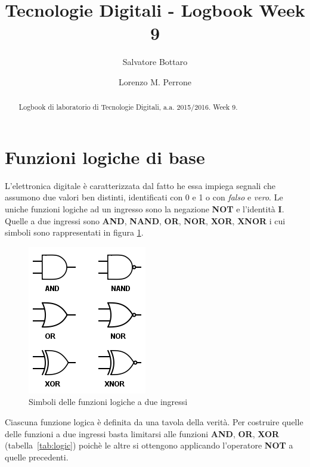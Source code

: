 \documentclass[journal, a4paper]{IEEEtran}
\begin{document}
	\title{Tecnologie Digitali - Logbook Week 9}
	\author[1]{Salvatore Bottaro}
		\author[2]{Lorenzo M. Perrone}
	\maketitle
	
\begin{abstract}
	Logbook di laboratorio di Tecnologie Digitali, a.a. 2015/2016. Week 9.
\end{abstract}

\section{Funzioni logiche di base}

L'elettronica digitale è caratterizzata dal fatto he essa impiega segnali che assumono due valori ben distinti, identificati con 0 e 1 o con \emph{falso} e \emph{vero}. Le uniche funzioni logiche ad un ingresso sono la negazione \textbf{NOT} e l'identità \textbf{I}. Quelle a due ingressi sono \textbf{AND}, \textbf{NAND}, \textbf{OR}, \textbf{NOR}, \textbf{XOR}, \textbf{XNOR} i cui simboli sono rappresentati in figura \ref{fig:logic}. 

\begin{figure}[htp]
\centering
\includegraphics[scale=.55]{logic}
\caption{Simboli delle funzioni logiche a due ingressi}
\label{fig:logic}
\end{figure}

Ciascuna funzione logica è definita da una tavola della verità. Per costruire quelle delle funzioni a due ingressi basta limitarsi alle funzioni \textbf{AND}, \textbf{OR}, \textbf{XOR} (tabella~\ref{tab:logic}) poichè le altre si ottengono applicando l'operatore \textbf{NOT} a quelle precedenti.
\end{document}
